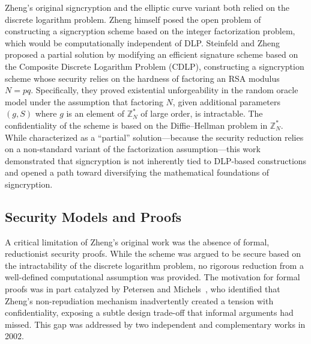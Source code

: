 \documentclass[conference]{IEEEtran}
\begin{document}
Zheng's original signcryption and the elliptic curve variant both relied on the discrete logarithm problem. Zheng himself posed the open problem of constructing a signcryption scheme based on the integer factorization problem, which would be computationally independent of DLP. Steinfeld and Zheng~\cite{steinfeld2000} proposed a partial solution by modifying an efficient signature scheme based on the Composite Discrete Logarithm Problem (CDLP), constructing a signcryption scheme whose security relies on the hardness of factoring an RSA modulus $N = pq$. Specifically, they proved existential unforgeability in the random oracle model under the assumption that factoring $N$, given additional parameters $(g, S)$ where $g$ is an element of $\mathbb{Z}_N^*$ of large order, is intractable. The confidentiality of the scheme is based on the Diffie--Hellman problem in $\mathbb{Z}_N^*$. While characterized as a ``partial'' solution---because the security reduction relies on a non-standard variant of the factorization assumption---this work demonstrated that signcryption is not inherently tied to DLP-based constructions and opened a path toward diversifying the mathematical foundations of signcryption.

\subsection{Security Models and Proofs}

A critical limitation of Zheng's original work was the absence of formal, reductionist security proofs. While the scheme was argued to be secure based on the intractability of the discrete logarithm problem, no rigorous reduction from a well-defined computational assumption was provided. The motivation for formal proofs was in part catalyzed by Petersen and Michels~\cite{petersen1998}, who identified that Zheng's non-repudiation mechanism inadvertently created a tension with confidentiality, exposing a subtle design trade-off that informal arguments had missed. This gap was addressed by two independent and complementary works in 2002.
\end{document}
